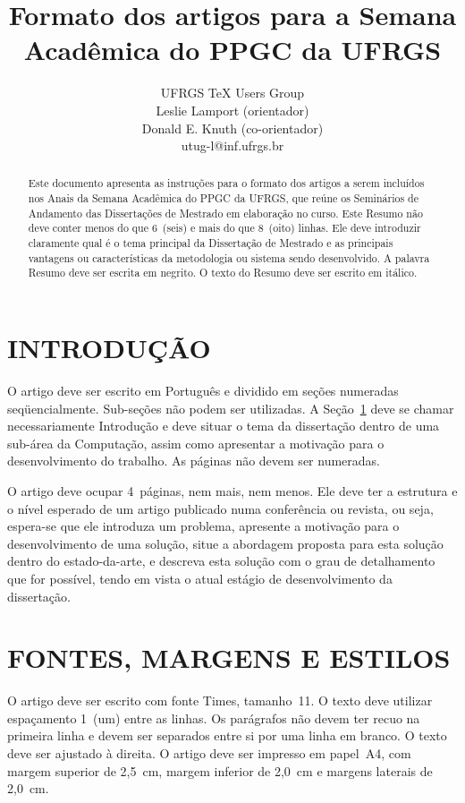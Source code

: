 \documentclass{sa}
\title{Formato dos artigos para a Semana Acadêmica do PPGC da UFRGS}
\author{%
\mbox{UFRGS} {\TeX} Users Group\\
Leslie Lamport (orientador)\\
Donald E. Knuth (co-orientador)\\
utug-l@inf.ufrgs.br
}
\begin{document}
\maketitle

\begin{abstract}
Este documento apresenta as instruções para o formato dos artigos a serem 
incluídos nos Anais da Semana Acadêmica do PPGC da UFRGS, que reúne os 
Seminários de Andamento das Dissertações de Mestrado em elaboração no curso. 
Este Resumo não deve conter menos do que 6~(seis) e mais do que 8~(oito) 
linhas. Ele deve introduzir claramente qual é o tema principal da Dissertação 
de Mestrado e as principais vantagens ou características da metodologia ou 
sistema sendo desenvolvido. A palavra Resumo deve ser escrita em negrito. 
O texto do Resumo deve ser escrito em itálico.
\end{abstract}
\section{INTRODUÇÃO}
\label{sec:intro}
O artigo deve ser escrito em Português e dividido em seções numeradas
seqüencialmente. Sub-seções não podem ser utilizadas. A
Seção~\ref{sec:intro} deve se chamar necessariamente Introdução e deve
situar o tema da dissertação dentro de uma sub-área da Computação,
assim como apresentar a motivação para o desenvolvimento do
trabalho. As páginas não devem ser numeradas.

O artigo deve ocupar 4~páginas, nem mais, nem menos. Ele deve ter a
estrutura e o nível esperado de um artigo publicado numa conferência
ou revista, ou seja, espera-se que ele introduza um problema,
apresente a motivação para o desenvolvimento de uma solução, situe a
abordagem proposta para esta solução dentro do estado-da-arte, e
descreva esta solução com o grau de detalhamento que for possível,
tendo em vista o atual estágio de desenvolvimento da dissertação.
\section{FONTES, MARGENS E ESTILOS}
O artigo deve ser escrito com fonte Times, tamanho~11. O texto deve utilizar 
espaçamento 1~(um) entre as linhas. Os parágrafos não devem ter recuo na 
primeira linha e devem ser separados entre si por uma linha em branco. O 
texto deve ser ajustado à direita. O artigo deve ser impresso em papel~A4, 
com margem superior de 2,5~cm, margem inferior de 2,0~cm e margens laterais 
de 2,0~cm.
\end{document}
